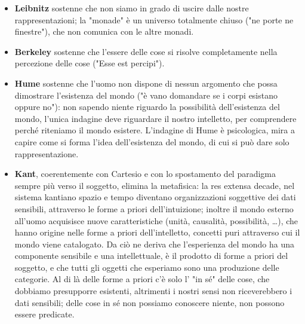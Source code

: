 \documentclass[a4paper,12pt,oneside]{article}%
\begin{document}
\begin{itemize}
	\item \textbf{Leibnitz} sostenne che non siamo in grado di uscire dalle nostre rappresentazioni; la "monade" è un universo totalmente chiuso ("ne porte ne finestre"), che non comunica con le altre monadi.
	\item \textbf{Berkeley} sostenne che l'essere delle cose si risolve completamente nella percezione delle cose ("Esse est percipi").
	\item \textbf{Hume} sostenne che l'uomo non dispone di nessun argomento che possa dimostrare l'esistenza del mondo ("è vano domandare se i corpi esistano oppure no"): non sapendo niente riguardo la possibilità dell'esistenza del mondo, l'unica indagine deve riguardare il nostro intelletto, per comprendere perché riteniamo il mondo esistere. L'indagine di Hume è psicologica, mira a capire come si forma l'idea dell'esistenza del mondo, di cui si può dare solo rappresentazione.
	\item \textbf{Kant}, coerentemente con Cartesio e con lo spostamento del paradigma sempre più verso il soggetto, elimina la metafisica: la res extensa decade, nel sistema kantiano spazio e tempo diventano organizzazioni soggettive dei dati sensibili, attraverso le forme a priori dell'intuizione; inoltre il mondo esterno all'uomo acquisisce nuove caratteristiche (unità, causalità, possibilità, \dots), che hanno origine nelle forme a priori dell'intelletto, concetti puri attraverso cui il mondo viene catalogato. Da ciò ne deriva che l'esperienza del mondo ha una componente sensibile e una intellettuale, è il prodotto di forme a priori del soggetto, e che tutti gli oggetti che esperiamo sono una produzione delle categorie. Al di là delle forme a priori c'è solo l' "in sé" delle cose, che dobbiamo presupporre esistenti, altrimenti i nostri sensi non riceverebbero i dati sensibili; delle cose in sé non possiamo conoscere niente, non possono essere predicate.
\end{itemize}

	
\end{document}
